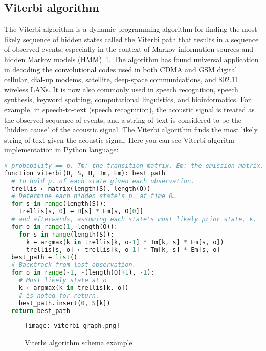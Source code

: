\subsection{Viterbi algorithm} \label{subsec:viterbi}
The Viterbi algorithm is a dynamic programming algorithm for finding the most likely sequence of hidden
states called the Viterbi path that results in a sequence of observed events, especially in the
context of Markov information sources and hidden Markov models (HMM)~\ref{Viterbi schema}.
The algorithm has found universal application in decoding the convolutional codes used in
both CDMA and GSM digital cellular, dial-up modems, satellite, deep-space communications, and 802.11 wireless LANs.
It is now also commonly used in speech recognition, speech synthesis, keyword spotting, computational
linguistics, and bioinformatics.
For example, in speech-to-text (speech recognition), the acoustic signal is treated as the observed sequence of events,
and a string of text is considered to be the "hidden cause" of the acoustic signal.
The Viterbi algorithm finds the most likely string of text given the acoustic signal.
Here you can see Viterbi algoritm implementation in Python language:~\cite{DBLP:journals/corr/abs-cs-0504020} \\
\begin{lstlisting}[language=python]
# probability == p. Tm: the transition matrix. Em: the emission matrix.
function viterbi(O, S, Π, Tm, Em): best_path
  # To hold p. of each state given each observation.
  trellis ← matrix(length(S), length(O))
  # Determine each hidden state's p. at time 0…
  for s in range(length(S)):
    trellis[s, 0] ← Π[s] * Em[s, O[0]]
  # and afterwards, assuming each state's most likely prior state, k.
  for o in range(1, length(O)):
    for s in range(length(S)):
      k ← argmax(k in trellis[k, o-1] * Tm[k, s] * Em[s, o])
      trellis[s, o] ← trellis[k, o-1] * Tm[k, s] * Em[s, o]
  best_path ← list()
  # Backtrack from last observation.
  for o in range(-1, -(length(O)+1), -1):
    # Most likely state at o
    k ← argmax(k in trellis[k, o])
    # is noted for return.
    best_path.insert(0, S[k])
  return best_path
\end{lstlisting}
\begin{figure}[h!]
	\begin{center}
		\texttt{[image: viterbi\_graph.png]}
	\end{center}
	\caption{Viterbi algorithm schema example}
	\label{Viterbi schema}
\end{figure}

